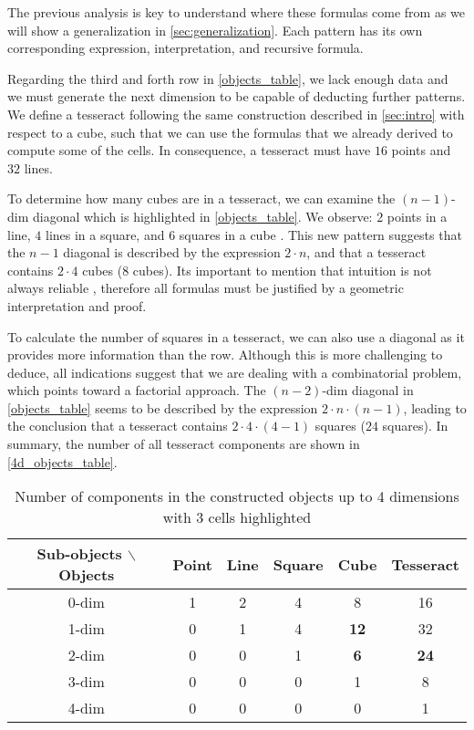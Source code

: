 \documentclass{article}
\begin{document}
	The previous analysis is key to understand where these formulas come from as we will show a generalization in \autoref{sec:generalization}. Each pattern has its own corresponding expression, interpretation, and recursive formula.
	
	Regarding the third and forth row in \autoref{objects_table}, we lack enough data and we must generate the next dimension to be capable of deducting further patterns. We define a tesseract following the same construction described in \autoref{sec:intro} with respect to a cube, such that we can use the formulas that we already derived to compute some of the cells. In consequence, a tesseract must have $16$ points and $32$ lines.
	
	To determine how many cubes are in a tesseract, we can examine the $(n-1)$-dim diagonal which is highlighted in \autoref{objects_table}. We observe: $2$ points in a line, $4$ lines in a square, and $6$ squares in a cube \cite{coxeter1973regular}. This new pattern suggests that the $n-1$ diagonal is described by the expression $2 \cdot n$, and that a tesseract contains $2 \cdot 4$ cubes ($8$ cubes). Its important to mention that intuition is not always reliable \cite{coxeter1973regular}, therefore all formulas must be justified by a geometric interpretation and proof.
	
	To calculate the number of squares in a tesseract, we can also use a diagonal as it provides more information than the row. Although this is more challenging to deduce, all indications suggest that we are dealing with a combinatorial problem, which points toward a factorial approach. The $(n-2)$-dim diagonal in \autoref{objects_table} seems to be described by the expression $2 \cdot n \cdot (n-1)$, leading to the conclusion that a tesseract contains $2 \cdot 4 \cdot (4-1)$ squares ($24$ squares). In summary, the number of all tesseract components are shown in \autoref{4d_objects_table}.
	
	\begin{table}[ht]
		\centering
		\begin{tabular}{||c || c c c c c||}
			\hline
			Sub-objects $\backslash$ Objects & Point & Line & Square & Cube & Tesseract \cite{coxeter1973regular}\\\hline\hline
			0-dim & 1 & 2 & 4 & 8  & 16\\\hline
			1-dim & 0 & 1 & 4 & \textbf{12} & 32\\\hline
			2-dim & 0 & 0 & 1 & \textbf{6}  & \textbf{24}\\\hline
			3-dim & 0 & 0 & 0 & 1  & 8 \\\hline
			4-dim & 0 & 0 & 0 & 0  & 1\\\hline
		\end{tabular}
		\caption{Number of components in the constructed objects up to 4 dimensions with 3 cells highlighted}
		\label{4d_objects_table}
	\end{table}
	
\end{document}

